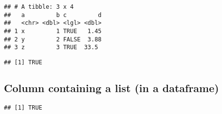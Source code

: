 \documentclass[]{article}
\newenvironment{Shaded}{\begin{snugshade}}{\end{snugshade}}
\newcommand{\KeywordTok}[1]{\textcolor[rgb]{0.13,0.29,0.53}{\textbf{#1}}}
\newcommand{\DecValTok}[1]{\textcolor[rgb]{0.00,0.00,0.81}{#1}}
\newcommand{\FloatTok}[1]{\textcolor[rgb]{0.00,0.00,0.81}{#1}}
\newcommand{\StringTok}[1]{\textcolor[rgb]{0.31,0.60,0.02}{#1}}
\newcommand{\OtherTok}[1]{\textcolor[rgb]{0.56,0.35,0.01}{#1}}
\newcommand{\OperatorTok}[1]{\textcolor[rgb]{0.81,0.36,0.00}{\textbf{#1}}}
\newcommand{\NormalTok}[1]{#1}
\begin{document}
\begin{verbatim}
## # A tibble: 3 x 4
##   a         b c         d
##   <chr> <dbl> <lgl> <dbl>
## 1 x         1 TRUE   1.45
## 2 y         2 FALSE  3.88
## 3 z         3 TRUE  33.5
\end{verbatim}

\begin{Shaded}
\end{Shaded}

\begin{verbatim}
## [1] TRUE
\end{verbatim}

\subsection{Column containing a list (in a
dataframe)}\label{column-containing-a-list-in-a-dataframe}

\begin{Shaded}
\end{Shaded}

\begin{verbatim}
## [1] TRUE
\end{verbatim}

\begin{Shaded}
\end{Shaded}
\end{document}
